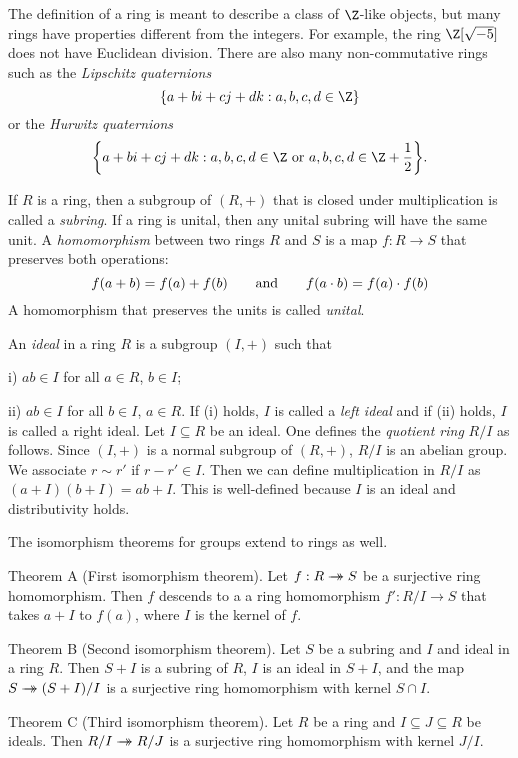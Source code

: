 The definition of a ring is meant to describe a class of $\Z$-like objects, but many rings have properties different from the integers. For example, the ring $\Z[\sqrt{-5}]$ does not have Euclidean division. There are also many non-commutative rings such as the {\it Lipschitz quaternions}
$$\{a + bi + cj + dk : a,b,c,d\in \Z\}$$
or the {\it Hurwitz quaternions}
$$\bigg\{a + bi + cj + dk : a,b,c,d\in \Z\ \hbox{or}\ a,b,c,d\in \Z + {1\over 2}\bigg\}.$$

If $R$ is a ring, then a subgroup of $(R,+)$ that is closed under multiplication is called a {\it subring}. If a ring is unital, then any unital subring will have the same unit. A {\it homomorphism} between two rings $R$ and $S$ is a map $f:R\to S$ that preserves both operations:
$$f(a+b) = f(a) + f(b) \qquad\hbox{and}\qquad f(a\cdot b) = f(a)\cdot f(b)$$
A homomorphism that preserves the units is called {\it unital}.

An {\it ideal} in a ring $R$ is a subgroup $(I,+)$ such that
\medskip
\item{i)} $ab\in I$ for all $a\in R$, $b\in I$;
\smallskip
\item{ii)} $ab\in I$ for all $b\in I$, $a\in R$.
\medskip
If (i) holds, $I$ is called a {\it left ideal} and if (ii) holds, $I$ is called a right ideal. Let $I \subseteq R$ be an ideal. One defines the {\it quotient ring} $R/I$ as follows. Since $(I,+)$ is a normal subgroup of $(R,+)$, $R/I$ is an abelian group. We associate $r\sim r'$ if $r-r'\in I$. Then we can define multiplication in $R/I$ as $(a+I)(b+I) = ab+I$. This is well-defined because $I$ is an ideal and distributivity holds.

The isomorphism theorems for groups extend to rings as well.

\parenproclaim Theorem A (First isomorphism theorem). Let $f:R\rightarrow\!\!\!\!\!\rightarrow S$ be a surjective ring homomorphism. Then $f$ descends to a a ring homomorphism $f' : R/I \to S$ that takes $a+I$ to $f(a)$, where $I$ is the kernel of $f$.\slug

\parenproclaim Theorem B (Second isomorphism theorem). Let $S$ be a subring and $I$ and ideal in a ring $R$. Then $S+I$ is a subring of $R$, $I$ is an ideal in $S+I$, and the map $S \rightarrow\!\!\!\!\!\rightarrow (S+I)/I$ is a surjective ring homomorphism with kernel $S\cap I$.\slug

\parenproclaim Theorem C (Third isomorphism theorem). Let $R$ be a ring and $I\subseteq J\subseteq R$ be ideals. Then $R/I \rightarrow\!\!\!\!\!\rightarrow R/J$ is a surjective ring homomorphism with kernel $J/I$.\slug

